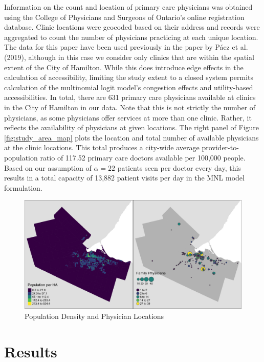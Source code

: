\documentclass{article}
\begin{document}
Information on the count and location of primary care physicians was
obtained using the College of Physicians and Surgeons of Ontario's
online registration database. Clinic locations were geocoded based on
their address and records were aggregated to count the number of
physicians practicing at each unique location. The data for this paper
have been used previously in the paper by Páez et al. (2019), although
in this case we consider only clinics that are within the spatial extent
of the City of Hamilton. While this does introduce edge effects in the
calculation of accessibility, limiting the study extent to a closed
system permits calculation of the multinomial logit model's congestion
effects and utility-based accessibilities. In total, there are 631
primary care physicians available at clinics in the City of Hamilton in
our data. Note that this is not strictly the number of physicians, as
some physicians offer services at more than one clinic. Rather, it
reflects the availability of physicians at given locations. The right
panel of Figure \ref{fig:study_area_map} plots the location and total
number of available physicians at the clinic locations. This total
produces a city-wide average provider-to-population ratio of 117.52
primary care doctors available per 100,000 people. Based on our
assumption of \(\alpha = 22\) patients seen per doctor every day, this
results in a total capacity of 13,882 patient visits per day in the MNL
model formulation.

\begin{figure}
\includegraphics[width=1\linewidth]{./img/study_area_map} \caption{\label{fig:study_area_map}Population Density and Physician Locations}\label{fig:plot study_area_map}
\end{figure}

\hypertarget{results}{%
\section{Results}\label{results}}
\end{document}
